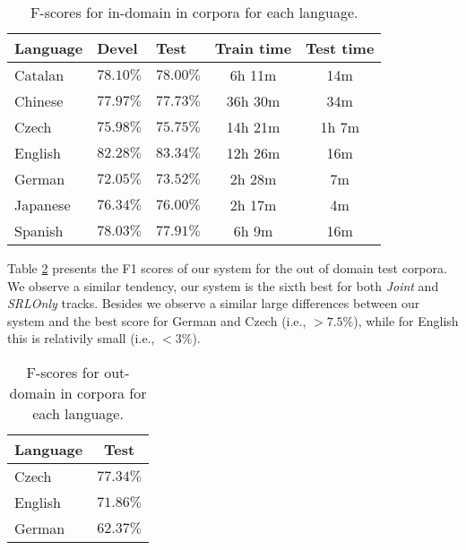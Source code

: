 \begin{table}
\begin{center}
\small
\begin{tabular}{|l|l|l|c|c|}\hline
Language           & Devel        & Test       & Train time  & Test time  
\\\hline\hline
Catalan         & $78.10\%$    & $78.00\%$  & 6h 11m  & 14m   \\ %
Chinese         & $77.97\%$    & $77.73\%$  & 36h 30m & 34m   \\ %
Czech           & $75.98\%$    & $75.75\%$  & 14h 21m & 1h 7m \\ %
English         & $82.28\%$    & $83.34\%$  & 12h 26m & 16m   \\ %
German          & $72.05\%$    & $73.52\%$  & 2h 28m  & 7m    \\ %
Japanese        & $76.34\%$    & $76.00\%$  & 2h 17m  & 4m    \\ %
Spanish         & $78.03\%$    & $77.91\%$  & 6h 9m   & 16m   \\ %

\hline
\end{tabular}
\caption{F-scores for in-domain in corpora for each language.}
\label{tbl:results}
\normalsize
\end{center}
\end{table}

Table \ref{tbl:outresults} presents the F1 scores of our system for the out of 
domain test corpora. We observe a similar tendency, our system is the sixth best 
for both \emph{Joint} and \emph{SRLOnly} tracks. Besides we observe a similar 
large differences between our system and the best score for German and Czech 
(i.e., $>7.5\%$), while for English this is relativily small (i.e., $<3\%$). 

\begin{table}
\begin{center}
\small
\begin{tabular}{|l|c|}\hline
Language        & Test       \\\hline\hline
Czech           & $77.34\%$  \\
English         & $71.86\%$  \\
German          & $62.37\%$  \\
\hline
\end{tabular}
\caption{F-scores for out-domain in corpora for each language.}
\label{tbl:outresults}
\normalsize
\end{center}
\end{table}

